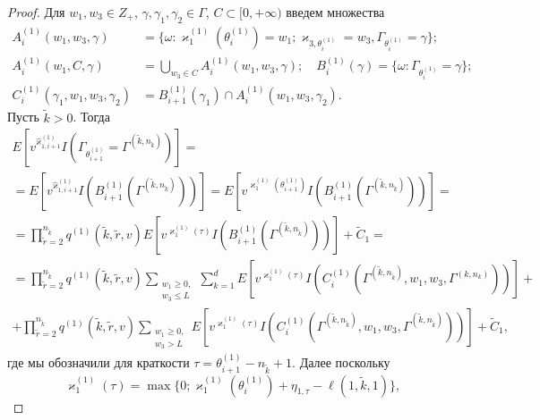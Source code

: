 \begin{proof}
Для $w_1, w_3 \in Z_+$, $\gamma, \gamma_1, \gamma_2 \in \Gamma$, $C \subset [0, +\infty)$ введем множества 
\begin{align*}
  A_i^{(1)}(w_1,w_3,\gamma) &= \{\omega\colon \varkappa_{1}^{(1)}(\theta_{i}^{(1)})=w_1; \varkappa_{3,\theta_{i}^{(1)}}=w_3, \Gamma_{\theta_{i}^{(1)}}=\gamma\};\\
  A_i^{(1)}(w_1,C,\gamma) &= \bigcup_{w_3 \in C} A_i^{(1)}(w_1,w_3,\gamma);\quad B_i^{(1)}(\gamma) =\{\omega\colon \Gamma_{\theta_{i}^{(1)}}=\gamma\};\\
  C_i^{(1)}(\gamma_1,w_1,w_3,\gamma_2)&= B_{i+1}^{(1)}(\gamma_1) \cap A_i^{(1)}(w_1,w_3,\gamma_2) .
\end{align*}
Пусть $\tilde{k}>0$. Тогда
\begin{multline*}
  E[v^{\hat{\varkappa}_{1,i+1}^{(1)}} I(\Gamma_{\theta_{i+1}^{(1)}}= \Gamma^{(\tilde{k},n_{\tilde{k}})})] =\\=E[v^{\hat{\varkappa}_{1,i+1}^{(1)}} I(B_{i+1}^{(1)}(\Gamma^{(\tilde{k},n_{\tilde{k}})}))] 
  =E[v^{\varkappa_{1}^{(1)}(\theta_{i+1}^{(1)})} I(B_{i+1}^{(1)}(\Gamma^{(\tilde{k},n_{\tilde{k}})}))] =\\
  =\prod_{\tilde{r}=2}^{n_{\tilde{k}}} q^{(1)}(\tilde{k},\tilde{r},v) E[v^{\varkappa_{1}^{(1)}(\tau)} I(B_{i+1}^{(1)}(\Gamma^{(\tilde{k},n_{\tilde{k}})}))] + \widetilde{C}_1=\\
  =\prod_{\tilde{r}=2}^{n_{\tilde{k}}} q^{(1)}(\tilde{k},\tilde{r},v) \sum_{\substack{w_1\geqslant 0, \\ w_3 \leqslant L}} \sum_{k=1}^d E[v^{\varkappa_{1}^{(1)}(\tau)} I( C_i^{(1)}(\Gamma^{(\tilde{k},n_{\tilde{k}})},w_1,w_3,\Gamma^{(k,n_k)} ))] + \\ +
    \prod_{\tilde{r}=2}^{n_{\tilde{k}}} q^{(1)}(\tilde{k},\tilde{r},v) \sum_{\substack{w_1\geqslant 0, \\ w_3 > L}}  E[v^{\varkappa_{1}^{(1)}(\tau)} I( C_i^{(1)}(\Gamma^{(\tilde{k},n_{\tilde{k}})},w_1,w_3,\Gamma^{(\tilde{k},n_{\tilde{k}})} ))] +\widetilde{C}_1,
\end{multline*}
где мы обозначили для краткости $\tau = \theta_{i+1}^{(1)} -n_{\tilde{k}} + 1$.
Далее поскольку 
$$\varkappa_{1}^{(1)}(\tau) = \max{\{0; \varkappa_{1 }^{(1)}(\theta_{i}^{(1)}) +\eta_{1,\tau}-\ell(1,\tilde{k},1) \}},
$$
\end{proof}
